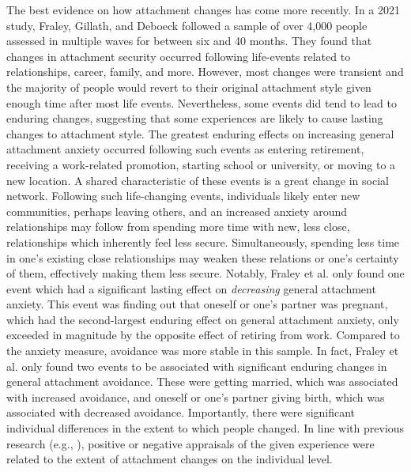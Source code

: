 \documentclass[12pt]{report}
\begin{document}
The best evidence on how attachment changes has come more recently. In a 2021 study, Fraley, Gillath, and Deboeck followed a sample of over 4,000 people assessed in multiple waves for between six and 40 months. They found that changes in attachment security occurred following life-events related to relationships, career, family, and more. However, most changes were transient and the majority of people would revert to their original attachment style given enough time after most life events.
Nevertheless, some events did tend to lead to enduring changes, suggesting that some experiences are likely to cause lasting changes to attachment style.
The greatest enduring effects on increasing general attachment anxiety occurred following such events as entering retirement, receiving a work-related promotion, starting school or university, or moving to a new location. A shared characteristic of these events is a great change in social network. Following such life-changing events, individuals likely enter new communities, perhaps leaving others, and an increased anxiety around relationships may follow from spending more time with new, less close, relationships which inherently feel less secure.
Simultaneously, spending less time in one's existing close relationships may weaken these relations or one's certainty of them, effectively making them less secure.
Notably, Fraley et al. only found one event which had a significant lasting effect on \textit{decreasing} general attachment anxiety. This event was finding out that oneself or one's partner was pregnant, which had the second-largest enduring effect on general attachment anxiety, only exceeded in magnitude by the opposite effect of retiring from work.
Compared to the anxiety measure, avoidance was more stable in this sample. In fact, Fraley et al. only found two events to be associated with significant enduring changes in general attachment avoidance. These were getting married, which was associated with increased avoidance, and oneself or one's partner giving birth, which was associated with decreased avoidance.
Importantly, there were significant individual differences in the extent to which people changed.
In line with previous research (e.g., ), positive or negative appraisals of the given experience were related to the extent of attachment changes on the individual level.
\end{document}
